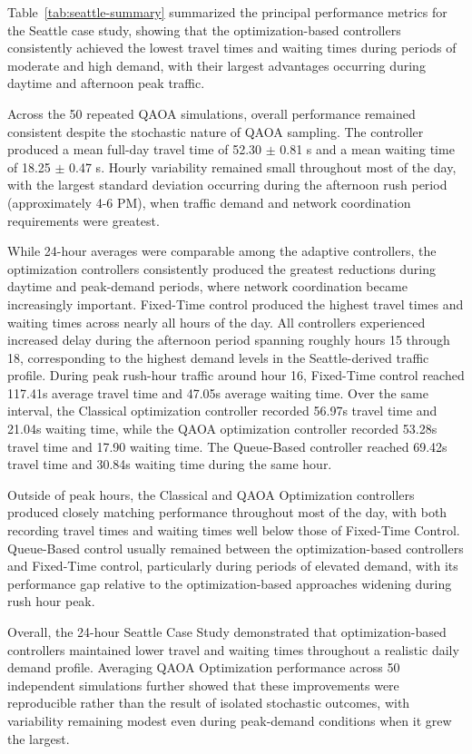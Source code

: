 \documentclass[12pt]{article}
\begin{document}
Table~\ref{tab:seattle-summary} summarized the principal performance metrics for the Seattle case study, showing that the optimization-based controllers consistently achieved the lowest travel times and waiting times during periods of moderate and high demand, with their largest advantages occurring during daytime and afternoon peak traffic. 

Across the 50 repeated QAOA simulations, overall performance remained consistent despite the stochastic nature of QAOA sampling. The controller produced a mean full-day travel time of 52.30 $\pm$ 0.81 s and a mean waiting time of 18.25 $\pm$ 0.47 s. Hourly variability remained small throughout most of the day, with the largest standard deviation occurring during the afternoon rush period (approximately 4-6 PM), when traffic demand and network coordination requirements were greatest.

While 24-hour averages were comparable among the adaptive controllers, the optimization controllers consistently produced the greatest reductions during daytime and peak-demand periods, where network coordination became increasingly important.
Fixed-Time control produced the highest travel times and waiting times across nearly all hours of the day. All controllers experienced increased delay during the afternoon period spanning roughly hours 15 through 18, corresponding to the highest demand levels in the Seattle-derived traffic profile. During peak rush-hour traffic around hour 16, Fixed-Time control reached 117.41s average travel time and 47.05s average waiting time. Over the same interval, the Classical optimization controller recorded 56.97s travel time and 21.04s waiting time, while the QAOA optimization controller recorded 53.28s travel time and 17.90 waiting time. The Queue-Based controller reached 69.42s travel time and 30.84s waiting time during the same hour.

Outside of peak hours, the Classical and QAOA Optimization  controllers produced closely matching performance throughout most of the day, with both recording travel times and waiting times well below those of Fixed-Time Control. Queue-Based control usually remained between the optimization-based controllers and Fixed-Time control, particularly during periods of elevated demand, with its performance gap relative to the optimization-based approaches widening during rush hour peak.

Overall, the 24-hour Seattle Case Study demonstrated that optimization-based controllers maintained lower travel and waiting times throughout a realistic daily demand profile. Averaging QAOA Optimization performance across 50 independent simulations further showed that these improvements were reproducible rather than the result of isolated stochastic outcomes, with variability remaining modest even during peak-demand conditions when it grew the largest.
\end{document}
